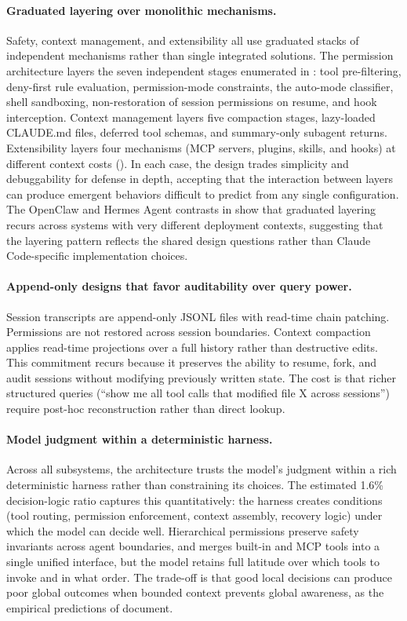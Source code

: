 \paragraph{Graduated layering over monolithic mechanisms.}
Safety, context management, and extensibility all use graduated stacks of independent mechanisms rather than single integrated solutions. The permission architecture layers the seven independent stages enumerated in : tool pre-filtering, deny-first rule evaluation, permission-mode constraints, the auto-mode classifier, shell sandboxing, non-restoration of session permissions on resume, and hook interception. Context management layers five compaction stages, lazy-loaded CLAUDE.md files, deferred tool schemas, and summary-only subagent returns. Extensibility layers four mechanisms (MCP servers, plugins, skills, and hooks) at different context costs (). In each case, the design trades simplicity and debuggability for defense in depth, accepting that the interaction between layers can produce emergent behaviors difficult to predict from any single configuration. The OpenClaw and Hermes Agent contrasts in  show that graduated layering recurs across systems with very different deployment contexts, suggesting that the layering pattern reflects the shared design questions rather than Claude Code-specific implementation choices.

\paragraph{Append-only designs that favor auditability over query power.}
Session transcripts are append-only JSONL files with read-time chain patching. Permissions are not restored across session boundaries. Context compaction applies read-time projections over a full history rather than destructive edits. This commitment recurs because it preserves the ability to resume, fork, and audit sessions without modifying previously written state. The cost is that richer structured queries (``show me all tool calls that modified file X across sessions'') require post-hoc reconstruction rather than direct lookup.

\paragraph{Model judgment within a deterministic harness.}
Across all subsystems, the architecture trusts the model's judgment within a rich deterministic harness rather than constraining its choices. The estimated 1.6\% decision-logic ratio captures this quantitatively: the harness creates conditions (tool routing, permission enforcement, context assembly, recovery logic) under which the model can decide well. Hierarchical permissions preserve safety invariants across agent boundaries, and  merges built-in and MCP tools into a single unified interface, but the model retains full latitude over which tools to invoke and in what order. The trade-off is that good local decisions can produce poor global outcomes when bounded context prevents global awareness, as the empirical predictions of  document.
